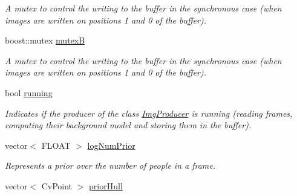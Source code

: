 \begin{DoxyCompactItemize}
\begin{DoxyCompactList}\small\item\em A {\ttfamily mutex} to control the writing to the buffer in the synchronous case (when images are written on positions 1 and 0 of the buffer). \item\end{DoxyCompactList}\item 
\hypertarget{classfindPersonStream_a7d2423f1bab03570005e017cfbd4e4de}{
boost::mutex \hyperlink{classfindPersonStream_a7d2423f1bab03570005e017cfbd4e4de}{mutexB}}
\label{classfindPersonStream_a7d2423f1bab03570005e017cfbd4e4de}

\begin{DoxyCompactList}\small\item\em A {\ttfamily mutex} to control the writing to the buffer in the synchronous case (when images are written on positions 1 and 0 of the buffer). \item\end{DoxyCompactList}\item 
\hypertarget{classfindPersonStream_a1a015fe02c9cea18a5cf62656e257c97}{
bool \hyperlink{classfindPersonStream_a1a015fe02c9cea18a5cf62656e257c97}{running}}
\label{classfindPersonStream_a1a015fe02c9cea18a5cf62656e257c97}

\begin{DoxyCompactList}\small\item\em Indicates if the {\ttfamily producer} of the class {\ttfamily \hyperlink{classImgProducer}{ImgProducer}} is running (reading frames, computing their background model and storing them in the buffer). \item\end{DoxyCompactList}\item 
\hypertarget{classfindPersonStream_aec055f0327e33fda5d4bd181196bdadd}{
vector$<$ FLOAT $>$ \hyperlink{classfindPersonStream_aec055f0327e33fda5d4bd181196bdadd}{logNumPrior}}
\label{classfindPersonStream_aec055f0327e33fda5d4bd181196bdadd}

\begin{DoxyCompactList}\small\item\em Represents a prior over the number of people in a frame. \item\end{DoxyCompactList}\item 
\hypertarget{classfindPersonStream_a5d52c2b63e66543818c04c097fe6ae3f}{
vector$<$ CvPoint $>$ \hyperlink{classfindPersonStream_a5d52c2b63e66543818c04c097fe6ae3f}{priorHull}}
\label{classfindPersonStream_a5d52c2b63e66543818c04c097fe6ae3f}


\end{DoxyCompactItemize}
